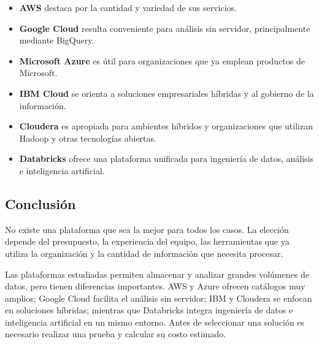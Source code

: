 \begin{itemize}
    \item \textbf{AWS} destaca por la cantidad y variedad de sus servicios.
    
    \item \textbf{Google Cloud} resulta conveniente para análisis sin servidor,
    principalmente mediante BigQuery.
    
    \item \textbf{Microsoft Azure} es útil para organizaciones que ya emplean
    productos de Microsoft.
    
    \item \textbf{IBM Cloud} se orienta a soluciones empresariales híbridas y
    al gobierno de la información.
    
    \item \textbf{Cloudera} es apropiada para ambientes híbridos y organizaciones
    que utilizan Hadoop y otras tecnologías abiertas.
    
    \item \textbf{Databricks} ofrece una plataforma unificada para ingeniería de
    datos, análisis e inteligencia artificial.
\end{itemize}

\subsection{Conclusión}

No existe una plataforma que sea la mejor para todos los casos. La elección
depende del presupuesto, la experiencia del equipo, las herramientas que ya
utiliza la organización y la cantidad de información que necesita procesar.

Las plataformas estudiadas permiten almacenar y analizar grandes volúmenes de
datos, pero tienen diferencias importantes. AWS y Azure ofrecen catálogos muy
amplios; Google Cloud facilita el análisis sin servidor; IBM y Cloudera se
enfocan en soluciones híbridas; mientras que Databricks integra ingeniería de
datos e inteligencia artificial en un mismo entorno. Antes de seleccionar una
solución es necesario realizar una prueba y calcular su costo estimado.
